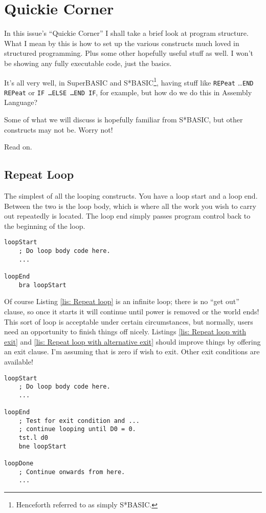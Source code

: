 
\chapter{Quickie Corner}

In this issue's ``Quickie Corner'' I shall take a brief look at program structure. What I mean by this is how to set up the various constructs much loved in structured programming. Plus some other hopefully useful stuff as well. I won't be showing any fully executable code, just the basics.

It's all very well, in SuperBASIC and S*BASIC\footnote{Henceforth referred to as simply S*BASIC.}, having stuff like \texttt{REPeat} \ldots \texttt{END REPeat} or \texttt{IF \ldots ELSE \ldots END IF}, for example, but how do we do this in Assembly Language? 

Some of what we will discuss is hopefully familiar from S*BASIC, but other constructs may not be. Worry not!

Read on.

\section{Repeat Loop}

The simplest of all the looping constructs. You have a loop start and a loop end. Between the two is the loop body, which is where all the work you wish to carry out repeatedly is located. The loop end simply passes program control back to the beginning of the loop.

\begin{lstlisting}[caption={Repeat loops in Assembly Code},label={lis: Repeat loop}]
loopStart
    ; Do loop body code here.
    ...

loopEnd
    bra loopStart
\end{lstlisting}

Of course Listing \ref{lis: Repeat loop} is an infinite loop; there is no ``get out'' clause, so once it starts it will continue until power is removed or the world ends! This sort of loop is acceptable under certain circumstances, but normally, users need an opportunity to finish things off nicely. Listings \ref{lis: Repeat loop with exit} and \ref{lis: Repeat loop with alternative exit} should improve things by offering an exit clause. I'm assuming that  is zero if wish to exit. Other exit conditions are available!

\begin{lstlisting}[caption={Repeat loops with exit in Assembly Code},label={lis: Repeat loop with exit}]
loopStart
    ; Do loop body code here.
    ...
    
loopEnd
    ; Test for exit condition and ...
    ; continue looping until D0 = 0.
    tst.l d0   
    bne loopStart
    
loopDone
    ; Continue onwards from here.
    ...
\end{lstlisting}

